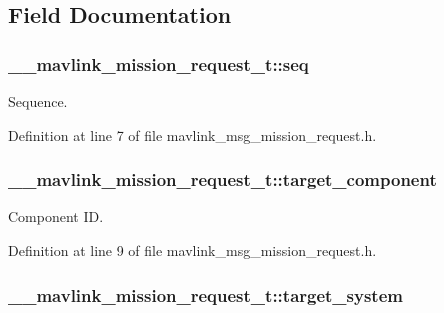 \subsection{Field Documentation}
\hypertarget{struct____mavlink__mission__request__t_adc8352db8e2a6dd3c5db6ec297e6d7ed}{
\subsubsection[{seq}]{ \-\_\-\-\_\-mavlink\-\_\-mission\-\_\-request\-\_\-t\-::seq}}\label{struct____mavlink__mission__request__t_adc8352db8e2a6dd3c5db6ec297e6d7ed}


Sequence. 



Definition at line 7 of file mavlink\-\_\-msg\-\_\-mission\-\_\-request.\-h.

\hypertarget{struct____mavlink__mission__request__t_a3bef9f78c3256322231456b15601f1a6}{
\subsubsection[{target\-\_\-component}]{ \-\_\-\-\_\-mavlink\-\_\-mission\-\_\-request\-\_\-t\-::target\-\_\-component}}\label{struct____mavlink__mission__request__t_a3bef9f78c3256322231456b15601f1a6}


Component I\-D. 



Definition at line 9 of file mavlink\-\_\-msg\-\_\-mission\-\_\-request.\-h.

\hypertarget{struct____mavlink__mission__request__t_a8e2bdf5722c43082dfccd49839f7da43}{
\subsubsection[{target\-\_\-system}]{ \-\_\-\-\_\-mavlink\-\_\-mission\-\_\-request\-\_\-t\-::target\-\_\-system}}\label{struct____mavlink__mission__request__t_a8e2bdf5722c43082dfccd49839f7da43}


